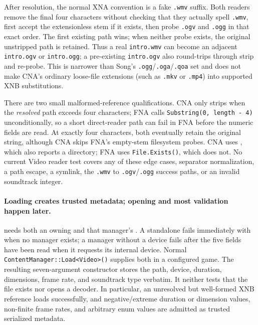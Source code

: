 After resolution, the normal XNA convention is a fake \texttt{.wmv} suffix.  Both readers remove
the final four characters without checking that they actually spell \texttt{.wmv}, first accept
the extensionless stem if it exists, then probe \texttt{.ogv} and \texttt{.ogg} in that exact
order.  The first existing path wins; when neither probe exists, the original unstripped path is
retained.  Thus a real \texttt{intro.wmv} can become an adjacent \texttt{intro.ogv} or
\texttt{intro.ogg}; a pre-existing \texttt{intro.ogv} also round-trips through strip and
re-probe.  This is narrower than Song's \texttt{.ogg}/\texttt{.oga}/\texttt{.qoa} set and does
not make CNA's ordinary loose-file  extensions (such as \texttt{.mkv} or
\texttt{.mp4}) into supported XNB substitutions.

There are two small malformed-reference qualifications.  CNA only strips when the \emph{resolved}
path exceeds four characters; FNA calls \texttt{Substring(0, length - 4)} unconditionally, so a
short direct-reader path can fail in FNA before the numeric fields are read.  At exactly four
characters, both eventually retain the original string, although CNA skips FNA's empty-stem
filesystem probes.  CNA uses , which also reports a directory;
FNA uses \texttt{File.Exists()}, which does not.  No current Video reader test covers any of
these edge cases, separator normalization, a path escape, a symlink, the \texttt{.wmv} to
\texttt{.ogv}/\texttt{.ogg} success paths, or an invalid soundtrack integer.

\paragraph{Loading creates trusted metadata; opening and most validation happen later.}
 needs both an owning  and that manager's
.  A standalone  fails immediately with
 when no manager exists; a manager without a device fails after
the five fields have been read when it requests its internal device.  Normal
\texttt{ContentManager::Load<Video>()} supplies both in a configured game.  The resulting
seven-argument  constructor stores the path, device, duration, dimensions,
frame rate, and soundtrack type verbatim.  It neither tests that the file exists nor opens a
decoder.  In particular, an unresolved but well-formed XNB reference loads successfully, and
negative/extreme duration or dimension values, non-finite frame rates, and arbitrary enum values
are admitted as trusted serialized metadata.

